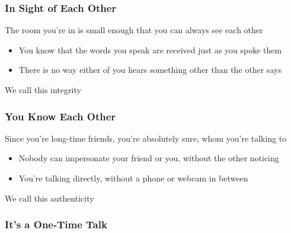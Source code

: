 \documentclass[
	aspectratio=169,
	xetex,
]{beamer}
\begin{document}
\begin{frame}
	\frametitle{In Sight of Each Other}
	The room you're in is small enough that you can always see each other
	\begin{itemize}
		\item You know that the words you speak are received just as you spoke them
		\item There is no way either of you hears something other than the other says
	\end{itemize}
	We call this \alert{integrity}
\end{frame}

\begin{frame}
	\frametitle{You Know Each Other}
	Since you're long-time friends, you're absolutely sure, whom you're talking to
	\begin{itemize}
		\item Nobody can impersonate your friend or you, without the other noticing
		\item You're talking directly, without a phone or webcam in between
	\end{itemize}
	We call this \alert{authenticity}
\end{frame}

\begin{frame}
	\frametitle{It's a One-Time Talk}
\end{frame}
\end{document}
